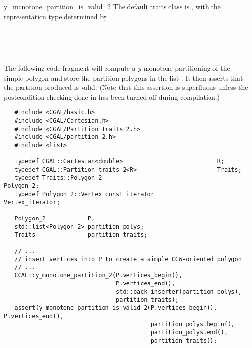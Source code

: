 \begin{ccRefFunction}{y_monotone_partition_is_valid_2}
The default traits class  is ,%
with the representation type determined by .

\ccSeeAlso

 \\
 \\
 \\

\ccExample

The following code fragment will compute a $y$-monotone
partitioning of the simple polygon  
and store the partition polygons in the list .
It then asserts that the partition produced is valid.
(Note that this assertion is superfluous unless the postcondition checking
done in  has been turned off during
compilation.)

\begin{verbatim}
   #include <CGAL/basic.h>
   #include <CGAL/Cartesian.h>
   #include <CGAL/Partition_traits_2.h>
   #include <CGAL/partition_2.h>
   #include <list>

   typedef CGAL::Cartesian<double>                           R;
   typedef CGAL::Partition_traits_2<R>                       Traits;
   typedef Traits::Polygon_2                                 Polygon_2;
   typedef Polygon_2::Vertex_const_iterator                  Vertex_iterator;

   Polygon_2            P;
   std::list<Polygon_2> partition_polys;
   Traits               partition_traits;

   // ...
   // insert vertices into P to create a simple CCW-oriented polygon
   // ...
   CGAL::y_monotone_partition_2(P.vertices_begin(),
                                P.vertices_end(),
                                std::back_inserter(partition_polys),
                                partition_traits);
   assert(y_monotone_partition_is_valid_2(P.vertices_begin(), P.vertices_end(),
                                          partition_polys.begin(), 
                                          partition_polys.end(),
                                          partition_traits));
\end{verbatim}

\end{ccRefFunction}
\renewcommand\ccRefPageBegin{\ccParDims\cgalColumnLayout}
\renewcommand\ccRefPageEnd{\ccParDims\cgalColumnLayout}
